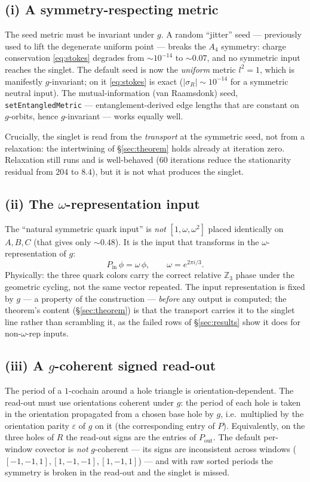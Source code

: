 \documentclass[11pt]{article}
\theoremstyle{definition}
\newcommand{\Z}{\mathbb{Z}}
\newcommand{\abs}[1]{\left\lvert #1 \right\rvert}
\newcommand{\sigmacol}{\sigma}
\newcommand{\Pin}{P_{\mathrm{in}}}
\newcommand{\Pout}{P_{\mathrm{out}}}
\begin{document}
\subsection{(i) A symmetry-respecting metric}
The seed metric must be invariant under $g$. A random ``jitter'' seed --- previously
used to lift the degenerate uniform point --- breaks the $A_4$ symmetry: charge
conservation \eqref{eq:stokes} degrades from $\sim 10^{-14}$ to $\sim 0.07$, and no
symmetric input reaches the singlet. The default seed is now the \emph{uniform} metric
$l^2=1$, which is manifestly $g$-invariant; on it \eqref{eq:stokes} is exact
($\abs{\sigmacol_R}\sim 10^{-14}$ for a symmetric neutral input). The mutual-information
(van Raamsdonk) seed, \texttt{setEntangledMetric} --- entanglement-derived edge
lengths that are constant on $g$-orbits, hence $g$-invariant --- works equally well.

Crucially, the singlet is read from the \emph{transport} at the symmetric seed, not
from a relaxation: the intertwining of \S\ref{sec:theorem} holds already at iteration
zero. Relaxation still runs and is well-behaved ($60$ iterations reduce the
stationarity residual from $204$ to $8.4$), but it is not what produces the singlet.

\subsection{(ii) The \texorpdfstring{$\omega$}{omega}-representation input}
The ``natural symmetric quark input'' is \emph{not} $[1,\omega,\omega^2]$ placed
identically on $A,B,C$ (that gives only $\sim 0.48$). It is the input that transforms
in the $\omega$-representation of $g$:
\begin{equation}
  \Pin\,\phi = \omega\,\phi, \qquad \omega = e^{2\pi i/3}.
  \label{eq:omegainput}
\end{equation}
Physically: the three quark colors carry the correct relative $\Z_3$ phase under the
geometric cycling, not the same vector repeated. The input representation is fixed by
$g$ --- a property of the construction --- \emph{before} any output is computed; the
theorem's content (\S\ref{sec:theorem}) is that the transport carries it to the
singlet line rather than scrambling it, as the failed rows of \S\ref{sec:results}
show it does for non-$\omega$-rep inputs.

\subsection{(iii) A \texorpdfstring{$g$}{g}-coherent signed read-out}
The period of a $1$-cochain around a hole triangle is orientation-dependent. The
read-out must use orientations coherent under $g$: the period of each hole is taken in
the orientation propagated from a chosen base hole by $g$, i.e.\ multiplied by the
orientation parity $\varepsilon$ of $g$ on it (the corresponding entry of $P$).
Equivalently, on the three holes of $R$ the read-out signs are the entries of $\Pout$.
The default per-window covector is \emph{not} $g$-coherent --- its signs are
inconsistent across windows ($[-1,-1,1],[1,-1,-1],[1,-1,1]$) --- and with raw sorted
periods the symmetry is broken in the read-out and the singlet is missed.
\end{document}
